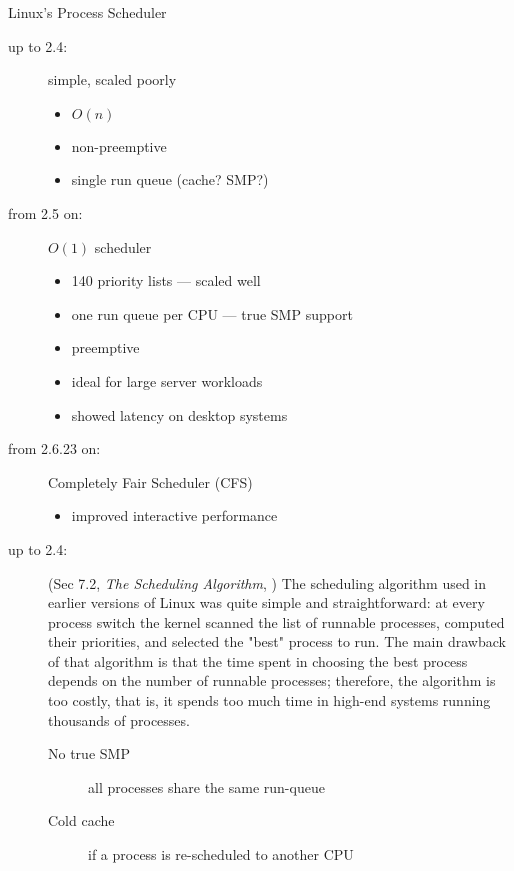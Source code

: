 \begin{frame}{Linux's Process Scheduler}
  \begin{description}
  \item[up to 2.4:] simple, scaled poorly
    \begin{multicols}{2}
      \begin{itemize}
      \item $O(n)$
      \item non-preemptive
      \item single run queue (cache? SMP?)
      \end{itemize}
    \end{multicols}
  \item[from 2.5 on:] $O(1)$ scheduler
    \begin{itemize}
    \item 140 priority lists --- scaled well
    \item one run queue per CPU --- true SMP support
    \item preemptive
    \item ideal for large server workloads
    \item showed latency on desktop systems
    \end{itemize}
  \item[from 2.6.23 on:] Completely Fair Scheduler (CFS)
    \begin{itemize}
    \item improved interactive performance
    \end{itemize}
  \end{description}
\end{frame}

\begin{description}
\item[up to 2.4:] (Sec 7.2, \emph{The Scheduling Algorithm},
  \cite{bovet2005understanding}) The scheduling algorithm used in earlier versions of
  Linux was quite simple and straightforward: at every process switch the kernel scanned
  the list of runnable processes, computed their priorities, and selected the "best"
  process to run. The main drawback of that algorithm is that the time spent in choosing
  the best process depends on the number of runnable processes; therefore, the algorithm
  is too costly, that is, it spends too much time in high-end systems running thousands of
  processes.
  \begin{description}
  \item[No true SMP] all processes share the same run-queue
  \item[Cold cache] if a process is re-scheduled to another CPU
  \end{description}
\end{description}


